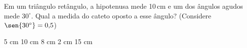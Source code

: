 Em um triângulo retângulo, a hipotenusa mede 10\,cm e um dos ângulos agudos mede $30^\circ$. Qual a medida do cateto oposto a esse ângulo? (Considere $\sen{30^\circ} = 0{,}5$)

\parbox{\linewidth}{


5 cm
10 cm
8 cm
2 cm
15 cm

}



